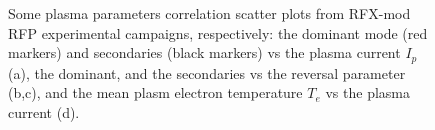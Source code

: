 \begin{figure}
    \centering
    \caption{Some plasma parameters correlation scatter plots from RFX-mod RFP experimental campaigns, respectively: the dominant mode (red markers) and secondaries (black markers) vs the plasma current $I_p$ (a), the dominant, and the secondaries vs the reversal parameter (b,c), and the mean plasm electron temperature $T_e$ vs the plasma current (d). }
    \label{fig:rfx_parameters}
\end{figure}


                                   
